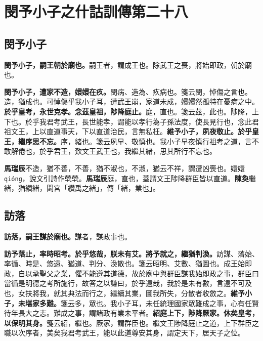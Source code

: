 \chapter{閔予小子之什詁訓傳第二十八}

\section{閔予小子}


\textbf{閔予小子，嗣王朝於廟也。}{\footnotesize 嗣王者，謂成王也。除武王之喪，將始即政，朝於廟也。}

\textbf{閔予小子，遭家不造，嬛嬛在疚。}{\footnotesize 閔病、造為、疚病也。箋云閔，悼傷之言也。造，猶成也。可悼傷乎我小子耳，遭武王崩，家道未成，嬛嬛然孤特在憂病之中。}\textbf{於乎皇考，永世克孝。念茲皇祖，陟降庭止。}{\footnotesize 庭，直也。箋云茲，此也。陟降，上下也。於乎我君考武王，長世能孝，謂能以孝行為子孫法度，使長見行也，念此君祖文王，上以直道事天，下以直道治民，言無私枉。}\textbf{維予小子，夙夜敬止。於乎皇王，繼序思不忘。}{\footnotesize 序，緒也。箋云夙早、敬慎也。我小子早夜慎行祖考之道，言不敢解倦也，於乎君王，歎文王武王也，我繼其緒，思其所行不忘也。}

\begin{quoting}\textbf{馬瑞辰}不造，猶不善，不善，猶不淑也，不淑，猶云不祥，謂遭凶喪也。嬛嬛 \texttt{qióng}，說文引詩作煢煢。\textbf{馬瑞辰}庭，直也，蓋謂文王陟降群臣皆以直道。\textbf{陳奐}繼緒，猶纘緒，閟宮「纘禹之緒」，傳「緒，業也」。\end{quoting}

\section{訪落}


\textbf{訪落，嗣王謀於廟也。}{\footnotesize 謀者，謀政事也。}

\textbf{訪予落止，率時昭考。於乎悠哉，朕未有艾。將予就之，繼猶判渙。}{\footnotesize 訪謀、落始、率循、時是、悠遠、猶道、判分、渙散也。箋云昭明、艾數、猶圖也。成王始即政，自以承聖父之業，懼不能遵其道德，故於廟中與群臣謀我始即政之事，群臣曰當循是明德之考所施行，故答之以謙曰，於乎遠哉，我於是未有數，言遠不可及也，女扶將我，就其典法而行之，繼續其業，圖我所失，分散者收斂之。}\textbf{維予小子，未堪家多難。}{\footnotesize 箋云多，眾也。我小子耳，未任統理國家眾難成之事，心有任賢待年長大之志。難成之事，謂諸政有業未平者。}\textbf{紹庭上下，陟降厥家。休矣皇考，以保明其身。}{\footnotesize 箋云紹，繼也。厥家，謂群臣也。繼文王陟降庭止之道，上下群臣之職以次序者，美矣我君考武王，能以此道尊安其身，謂定天下，居天子之位。}

